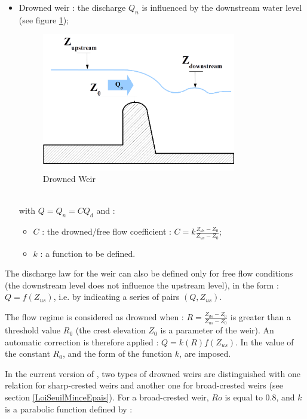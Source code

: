 \begin{itemize}
 \item \textsf{Drowned weir}  : the discharge $Q_n$ is influenced by the downstream water level (see figure \ref{fig:Sn});
   \begin{figure}
     \begin{center}
        \includegraphics[width=0.8\textwidth]{Figures/Schema_Seuil_Noye.png}
        \caption{Drowned Weir}
        \label{fig:Sn}
     \end{center}
   \end{figure}
   \\
   with $Q = Q_n = C Q_d$ and :
   \begin{itemize}
     \item $C$ : the drowned/free flow coefficient : $C = k \frac{Z_{ds}-Z_{0}}{Z_{us}-Z_0}$;
     \item $k$ : a function to be defined.
   \end{itemize}

\end{itemize}

The discharge law for the weir can also be defined only for free flow conditions (the downstream level does not influence the upstream level), in the form : $Q = f(Z_{us})$, i.e. by indicating a series of pairs $(Q,Z_{us})$.

The flow regime is considered as drowned when : $R = \frac{Z_{ds}-Z_0}{Z_{us}-Z_0}$ is greater than a threshold value $R_0$ (the crest elevation $Z_0$ is a parameter of the weir). An automatic correction is therefore applied : $Q = k(R) f(Z_{us})$. In \mascaret{} the value of the constant $R_0$, and the form of the function $k$, are imposed.

In the current version of \mascaret{}, two types of drowned weirs are distinguished with one relation for sharp-crested weirs and another one for broad-crested weirs (see section \ref{LoiSeuilMinceEpais}). For a broad-crested weir, $Ro$ is equal to 0.8, and $k$ is a parabolic function defined by :

